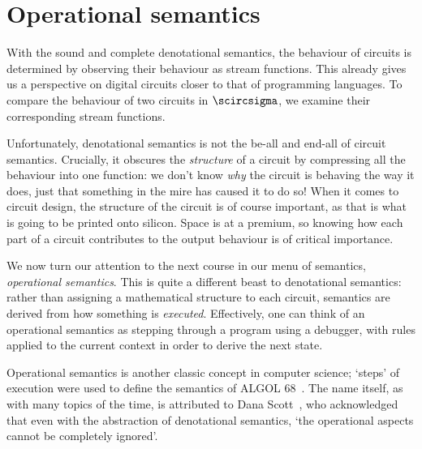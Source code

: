 \chapter{Operational semantics}

With the sound and complete denotational semantics, the behaviour of circuits is
determined by observing their behaviour as stream functions.
This already gives us a perspective on digital circuits closer to that of
programming languages.
To compare the behaviour of two circuits in \(\scircsigma\), we examine their
corresponding stream functions.

Unfortunately, denotational semantics is not the be-all and end-all of circuit
semantics.
Crucially, it obscures the \emph{structure} of a circuit by compressing all the
behaviour into one function: we don't know \emph{why} the circuit is behaving
the way it does, just that something in the mire has caused it to do so!
When it comes to circuit design, the structure of the circuit is of course
important, as that is what is going to be printed onto silicon.
Space is at a premium, so knowing how each part of a circuit contributes to the
output behaviour is of critical importance.

We now turn our attention to the next course in our menu of semantics,
\emph{operational semantics}.
This is quite a different beast to denotational semantics: rather than assigning
a mathematical structure to each circuit, semantics are derived from how
something is \emph{executed}.
Effectively, one can think of an operational semantics as stepping through a
program using a debugger, with rules applied to the current context in order to
derive the next state.

Operational semantics is another classic concept in computer science; `steps' of
execution were used to define the semantics of ALGOL
68~\cite{wijngarden1976revised}.
The name itself, as with many topics of the time, is attributed to Dana
Scott~\cite{scott1970outline}, who acknowledged that even with the abstraction
of denotational semantics, `the operational aspects cannot be completely
ignored'.

